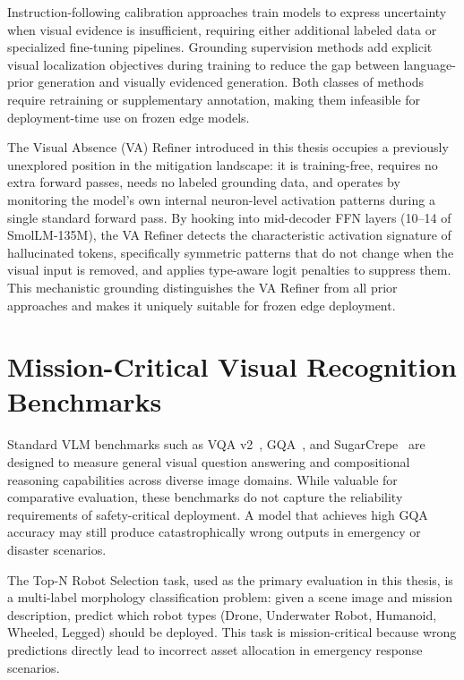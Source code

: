 Instruction-following calibration approaches train models to express uncertainty when visual evidence is insufficient, requiring either additional labeled data or specialized fine-tuning pipelines. Grounding supervision methods add explicit visual localization objectives during training to reduce the gap between language-prior generation and visually evidenced generation. Both classes of methods require retraining or supplementary annotation, making them infeasible for deployment-time use on frozen edge models.

The Visual Absence (VA) Refiner introduced in this thesis occupies a previously unexplored position in the mitigation landscape: it is training-free, requires no extra forward passes, needs no labeled grounding data, and operates by monitoring the model's own internal neuron-level activation patterns during a single standard forward pass. By hooking into mid-decoder FFN layers (10--14 of SmolLM-135M), the VA Refiner detects the characteristic activation signature of hallucinated tokens, specifically symmetric patterns that do not change when the visual input is removed, and applies type-aware logit penalties to suppress them. This mechanistic grounding distinguishes the VA Refiner from all prior approaches and makes it uniquely suitable for frozen edge deployment.

\section{Mission-Critical Visual Recognition Benchmarks}
\label{sec:related_benchmarks}

Standard VLM benchmarks such as VQA v2~\cite{VQA}, GQA~\cite{hudson2019gqa}, and SugarCrepe~\cite{hsieh2023sugarcrepe} are designed to measure general visual question answering and compositional reasoning capabilities across diverse image domains. While valuable for comparative evaluation, these benchmarks do not capture the reliability requirements of safety-critical deployment. A model that achieves high GQA accuracy may still produce catastrophically wrong outputs in emergency or disaster scenarios.

The Top-N Robot Selection task, used as the primary evaluation in this thesis, is a multi-label morphology classification problem: given a scene image and mission description, predict which robot types (Drone, Underwater Robot, Humanoid, Wheeled, Legged) should be deployed. This task is mission-critical because wrong predictions directly lead to incorrect asset allocation in emergency response scenarios.

